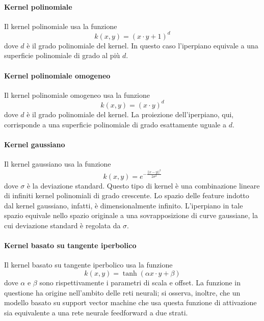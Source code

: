 \documentclass[12pt]{report}
\theoremstyle{definition}
\begin{document}
\paragraph{Kernel polinomiale}
Il kernel polinomiale usa la funzione
\begin{equation}
    k(x,y) = (x \cdot y + 1)^d
\end{equation}
dove $d$ è il grado polinomiale del kernel.
In questo caso l'iperpiano equivale a una superficie polinomiale di grado al più $d$.

\paragraph{Kernel polinomiale omogeneo}
Il kernel polinomiale omogeneo usa la funzione
\begin{equation}
    k(x,y) = (x \cdot y)^d
\end{equation}
dove $d$ è il grado polinomiale del kernel. La proiezione dell'iperpiano, qui, corrisponde a una superficie polinomiale di grado esattamente uguale a $d$.

\paragraph{Kernel gaussiano}
Il kernel gaussiano usa la funzione
\begin{equation}
    k(x,y) = e^{-\frac{||x-y||^2}{2\sigma^2}}
\end{equation}
dove $\sigma$ è la deviazione standard. Questo tipo di kernel è una combinazione lineare di infiniti kernel polinomiali di grado crescente. Lo spazio delle feature indotto dal kernel gaussiano, infatti, è dimensionalmente infinito. L'iperpiano in tale spazio equivale nello spazio originale a una sovrapposizione di curve gaussiane, la cui deviazione standard è regolata da $\sigma$.

\paragraph{Kernel basato su tangente iperbolico}
Il kernel basato su tangente iperbolico usa la funzione
\begin{equation}
    k(x,y) = \tanh(\alpha x \cdot y + \beta)
\end{equation}
dove $\alpha$ e $\beta$ sono rispettivamente i parametri di scala e offset. La funzione in questione ha origine nell'ambito delle reti neurali; si osserva, inoltre, che un modello basato su support vector machine che usa questa funzione di attivazione sia equivalente a una rete neurale feedforward a due strati.
\end{document}

